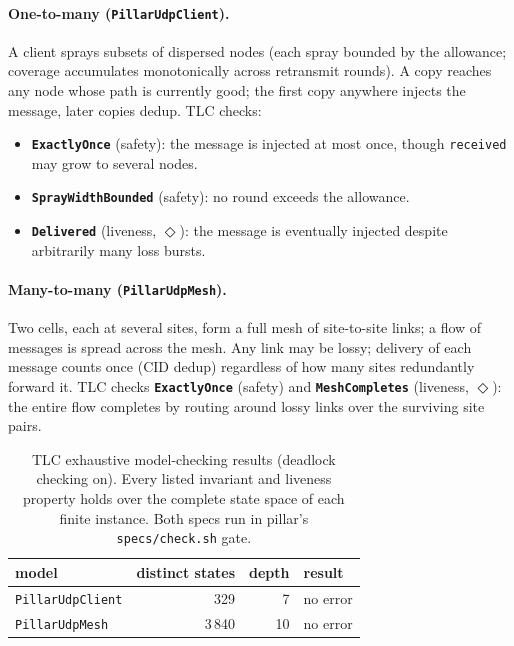 \documentclass[10pt,twocolumn]{article}
\newcommand{\code}[1]{\texttt{\small #1}}
\begin{document}
\paragraph{One-to-many (\code{PillarUdpClient}).}
A client sprays subsets of dispersed nodes (each spray bounded by the
allowance; coverage accumulates monotonically across retransmit rounds). A copy
reaches any node whose path is currently good; the first copy anywhere injects
the message, later copies dedup. TLC checks:
\begin{itemize}\itemsep1pt
  \item \textbf{\code{ExactlyOnce}} (safety): the message is injected at most
  once, though \code{received} may grow to several nodes.
  \item \textbf{\code{SprayWidthBounded}} (safety): no round exceeds the
  allowance.
  \item \textbf{\code{Delivered}} (liveness, $\Diamond$): the message is
  eventually injected despite arbitrarily many loss bursts.
\end{itemize}

\paragraph{Many-to-many (\code{PillarUdpMesh}).}
Two cells, each at several sites, form a full mesh of site-to-site links; a
flow of messages is spread across the mesh. Any link may be lossy; delivery of
each message counts once (CID dedup) regardless of how many sites redundantly
forward it. TLC checks \textbf{\code{ExactlyOnce}} (safety) and
\textbf{\code{MeshCompletes}} (liveness, $\Diamond$): the entire flow completes
by routing around lossy links over the surviving site pairs.

\begin{table}[t]
\centering
\small
\begin{tabular}{@{}lrrl@{}}
\toprule
model & distinct states & depth & result \\
\midrule
\code{PillarUdpClient} & 329   & 7  & no error \\
\code{PillarUdpMesh}   & 3\,840 & 10 & no error \\
\bottomrule
\end{tabular}
\caption{TLC exhaustive model-checking results (deadlock checking on). Every
listed invariant and liveness property holds over the complete state space of
each finite instance. Both specs run in pillar's \code{specs/check.sh} gate.}
\label{tab:tlc}
\end{table}
\end{document}

